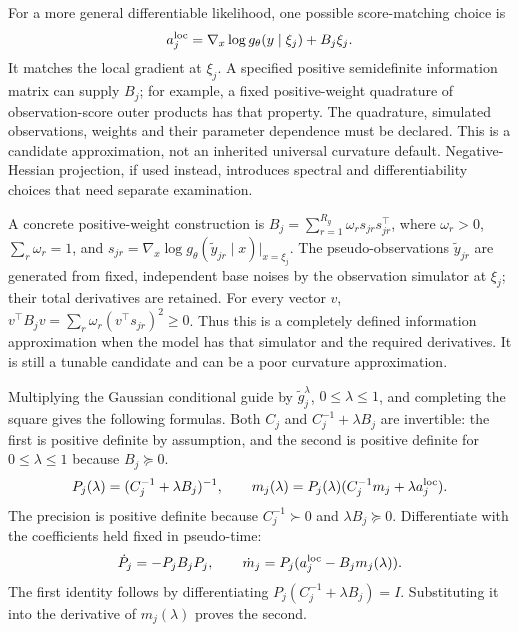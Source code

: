For a more general differentiable likelihood, one possible score-matching
choice is
\[
 a_j^{\rm loc}
 =\nabla_x\log g_\theta(y\mid \xi_j)+B_j\xi_j .
\]
It matches the local gradient at \(\xi_j\). A specified positive
semidefinite information matrix can supply \(B_j\); for example, a fixed
positive-weight quadrature of observation-score outer products has that
property. The quadrature, simulated observations, weights and their
parameter dependence must be declared. This is a candidate approximation,
not an inherited universal curvature default. Negative-Hessian projection,
if used instead, introduces spectral and differentiability choices that
need separate examination.

A concrete positive-weight construction is
\(B_j=\sum_{r=1}^{R_g}\omega_r s_{jr}s_{jr}^\top\),
where \(\omega_r>0\), \(\sum_r\omega_r=1\), and
\(s_{jr}=\nabla_x\log g_\theta(\widetilde y_{jr}\mid x)|_{x=\xi_j}\).
The pseudo-observations \(\widetilde y_{jr}\) are generated from fixed,
independent base noises by the observation simulator at \(\xi_j\);
their total derivatives are retained. For every vector \(v\),
\(v^\top B_jv=\sum_r\omega_r(v^\top s_{jr})^2\geq0\).
Thus this is a completely defined information approximation when the
model has that simulator and the required derivatives. It is still a
tunable candidate and can be a poor curvature approximation.

Multiplying the Gaussian conditional guide by
\(\widetilde g_j^\lambda\), \(0\leq\lambda\leq1\), and completing the
square gives the following formulas. Both \(C_j\) and
\(C_j^{-1}+\lambda B_j\) are invertible: the first is positive definite
by assumption, and the second is positive definite for
\(0\leq\lambda\leq1\) because \(B_j\succeq0\).
\begin{equation}
\label{eq:bf-covariance-proposal-bridge-moments}
 P_j(\lambda)=(C_j^{-1}+\lambda B_j)^{-1},\qquad
 m_j(\lambda)=P_j(\lambda)
       (C_j^{-1}m_j+\lambda a_j^{\rm loc}).
\end{equation}
The precision is positive definite because \(C_j^{-1}\succ0\) and
\(\lambda B_j\succeq0\). Differentiate with the coefficients held fixed
in pseudo-time:
\begin{equation}
\label{eq:bf-covariance-proposal-bridge-derivatives}
 \dot P_j=-P_jB_jP_j,\qquad
 \dot m_j=P_j(a_j^{\rm loc}-B_jm_j(\lambda)).
\end{equation}
The first identity follows by differentiating
\(P_j(C_j^{-1}+\lambda B_j)=I\). Substituting it into the derivative
of \(m_j(\lambda)\) proves the second.

